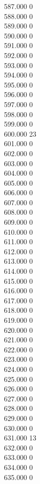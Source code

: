 { 587.000	0 \\
 588.000	0 \\
 589.000	0 \\
 590.000	0 \\
 591.000	0 \\
 592.000	0 \\
 593.000	0 \\
 594.000	0 \\
 595.000	0 \\
 596.000	0 \\
 597.000	0 \\
 598.000	0 \\
 599.000	0 \\
 600.000	23 \\
 601.000	0 \\
 602.000	0 \\
 603.000	0 \\
 604.000	0 \\
 605.000	0 \\
 606.000	0 \\
 607.000	0 \\
 608.000	0 \\
 609.000	0 \\
 610.000	0 \\
 611.000	0 \\
 612.000	0 \\
 613.000	0 \\
 614.000	0 \\
 615.000	0 \\
 616.000	0 \\
 617.000	0 \\
 618.000	0 \\
 619.000	0 \\
 620.000	0 \\
 621.000	0 \\
 622.000	0 \\
 623.000	0 \\
 624.000	0 \\
 625.000	0 \\
 626.000	0 \\
 627.000	0 \\
 628.000	0 \\
 629.000	0 \\
 630.000	0 \\
 631.000	13 \\
 632.000	0 \\
 633.000	0 \\
 634.000	0 \\
 635.000	0 \\
}
